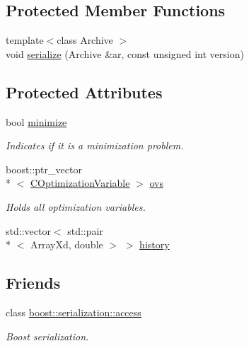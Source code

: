 \subsection*{Protected Member Functions}
\begin{DoxyCompactItemize}
\item 
{\footnotesize template$<$class Archive $>$ }\\void \hyperlink{class_c_optimization_problem_ad5b8db9e394c4eedeb28686acb4dce43}{serialize} (Archive \&ar, const unsigned int version)
\end{DoxyCompactItemize}
\subsection*{Protected Attributes}
\begin{DoxyCompactItemize}
\item 
bool \hyperlink{class_c_optimization_problem_a142569515a786cf11c7ec6337e9aca61}{minimize}
\begin{DoxyCompactList}\small\item\em Indicates if it is a minimization problem. \end{DoxyCompactList}\item 
boost\-::ptr\-\_\-vector\\*
$<$ \hyperlink{class_c_optimization_variable}{C\-Optimization\-Variable} $>$ \hyperlink{class_c_optimization_problem_a42fa0c335f002a47acab9e846bbc13ea}{ovs}
\begin{DoxyCompactList}\small\item\em Holds all optimization variables. \end{DoxyCompactList}\item 
std\-::vector$<$ std\-::pair\\*
$<$ Array\-Xd, double $>$ $>$ \hyperlink{class_c_optimization_problem_a86bb928e976091481a4f26db15a67ff5}{history}
\end{DoxyCompactItemize}
\subsection*{Friends}
\begin{DoxyCompactItemize}
\item 
class \hyperlink{class_c_optimization_problem_ac98d07dd8f7b70e16ccb9a01abf56b9c}{boost\-::serialization\-::access}
\begin{DoxyCompactList}\small\item\em Boost serialization. \end{DoxyCompactList}\end{DoxyCompactItemize}


